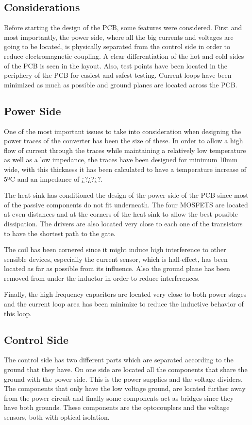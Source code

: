 \subsection{Considerations} \label{PCB_Considerations}
Before starting the design of the PCB, some features were considered. First and most importantly, the power side, where all the big currents and voltages are going to be located, is physically separated from the control side in order to reduce electromagnetic coupling.  A clear differentiation of the hot and cold sides of the PCB is seen in the layout.  Also, test points have been located in the periphery of the PCB for easiest and safest testing. Current loops have been minimized as much as possible and ground planes are located across the PCB. 

\subsection{Power Side} \label{PCB_Power}
One of the most important issues to take into consideration when designing the power traces of the converter has been the size of these. In order to allow a high flow of current through the traces while maintaining a relatively low temperature as well as a low impedance, the traces have been designed for minimum 10mm wide, with this thickness it has been calculated to have a temperature increase of 5ºC and an impedance of ¿?¿?¿?.   

The heat sink has conditioned the design of the power side of the PCB since most of the passive components do not fit underneath. The four MOSFETS are located at even distances and at the corners of the heat sink to allow the best possible dissipation. The drivers are also located very close to each one of the transistors to have the shortest path to the gate.

The coil has been cornered since it might induce high interference to other sensible devices, especially the current sensor, which is hall-effect, has been located as far as possible from its influence. Also the ground plane has been removed from under the inductor in order to reduce interferences.

Finally, the high frequency capacitors are located very close to both power stages and the current loop area has been minimize to reduce the inductive behavior of this loop. 

\subsection{Control Side} \label{PCB_Control}
The control side has two different parts which are separated according to the ground that they have. On one side are located all the components that share the ground with the power side. This is the power supplies and the voltage dividers. The components that only have the low voltage ground, are located further away from the power circuit and finally some components act as bridges since they have both grounds. These components are the optocouplers and the voltage sensors, both with optical isolation.
 
